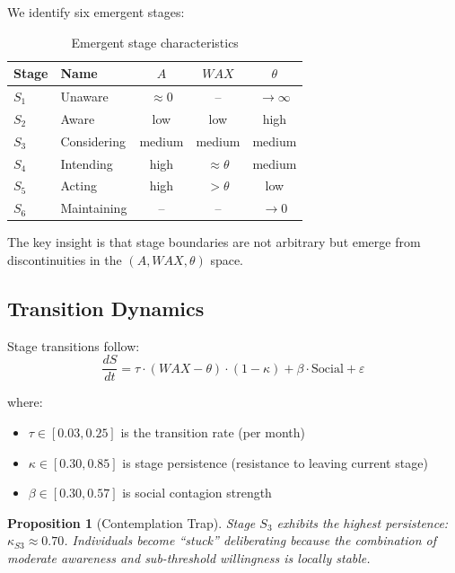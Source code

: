 \documentclass[12pt]{article}
\newtheorem{proposition}{Proposition}
\begin{document}
We identify six emergent stages:

\begin{table}[h]
\centering
\begin{tabular}{llccc}
\toprule
Stage & Name & $A$ & $WAX$ & $\theta$ \\
\midrule
$S_1$ & Unaware & $\approx 0$ & -- & $\to \infty$ \\
$S_2$ & Aware & low & low & high \\
$S_3$ & Considering & medium & medium & medium \\
$S_4$ & Intending & high & $\approx \theta$ & medium \\
$S_5$ & Acting & high & $> \theta$ & low \\
$S_6$ & Maintaining & -- & -- & $\to 0$ \\
\bottomrule
\end{tabular}
\caption{Emergent stage characteristics}
\label{tab:stages}
\end{table}

The key insight is that stage boundaries are not arbitrary but emerge from discontinuities in the $(A, WAX, \theta)$ space.

\subsection{Transition Dynamics}

Stage transitions follow:
\begin{equation}
\frac{dS}{dt} = \tau \cdot (WAX - \theta) \cdot (1 - \kappa) + \beta \cdot \text{Social} + \varepsilon
\end{equation}

where:
\begin{itemize}
    \item $\tau \in [0.03, 0.25]$ is the transition rate (per month)
    \item $\kappa \in [0.30, 0.85]$ is stage persistence (resistance to leaving current stage)
    \item $\beta \in [0.30, 0.57]$ is social contagion strength
\end{itemize}

\begin{proposition}[Contemplation Trap]
Stage $S_3$ exhibits the highest persistence: $\kappa_{S3} \approx 0.70$. Individuals become ``stuck'' deliberating because the combination of moderate awareness and sub-threshold willingness is locally stable.
\end{proposition}
\end{document}
